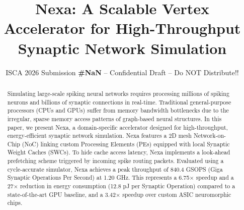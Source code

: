\documentclass[conference]{IEEEtran}
\begin{document}
\pdfpagewidth=8.5in
\pdfpageheight=11in

\newcommand{\iscasubmissionnumber}{NaN}


\title{Nexa: A Scalable Vertex Accelerator for High-Throughput Synaptic Network Simulation}
\author{\normalsize{ISCA 2026 Submission \textbf{\#\iscasubmissionnumber} --
  Confidential Draft -- Do NOT Distribute!!}}

\maketitle
\thispagestyle{plain}
\pagestyle{plain}

\noindent{}

\begin{abstract}
Simulating large-scale spiking neural networks requires processing millions of spiking
neurons and billions of synaptic connections in real-time. Traditional general-purpose
processors (CPUs and GPUs) suffer from memory bandwidth bottlenecks due to the irregular,
sparse memory access patterns of graph-based neural structures. In this paper, we present
Nexa, a domain-specific accelerator designed for high-throughput, energy-efficient synaptic
network simulation. Nexa features a 2D mesh Network-on-Chip (NoC) linking custom Processing
Elements (PEs) equipped with local Synaptic Weight Caches (SWCs). To hide cache access
latency, Nexa implements a look-ahead prefetching scheme triggered by incoming spike routing
packets. Evaluated using a cycle-accurate simulator, Nexa achieves a peak throughput of
840.4 GSOPS (Giga Synaptic Operations Per Second) at 1.20 GHz. This represents a
6.75$\times$ speedup and a 27$\times$ reduction in energy consumption (12.8 pJ per Synaptic
Operation) compared to a state-of-the-art GPU baseline, and a 3.42$\times$ speedup over
custom ASIC neuromorphic chips.
\end{abstract}











\end{document}
